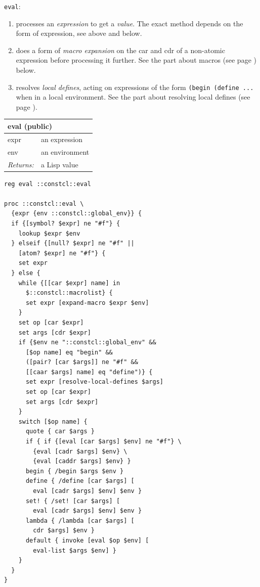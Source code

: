 \documentclass[twoside,9pt]{report}
\begin{document}
\texttt{eval}:

\begin{enumerate}
\item  processes an \emph{expression} to get a \emph{value}. The exact method depends on the form of expression, see above and below.
\item  does a form of \emph{macro expansion} on the car and cdr of a non-atomic expression before processing it further. See the part about macros (see page \pageref{macros}) below.
\item  resolves \emph{local defines}, acting on expressions of the form \texttt{(begin (define ...} when in a local environment. See the part about resolving local defines (see page \pageref{resolving-local-defines}).
\end{enumerate}
\begin{tabular}{ |l l| }
\hline
\multicolumn{2}{|l|}{eval (public)} \\
\hline
expr & an expression \\
env & an environment \\
\textit{Returns:} & a Lisp value \\
\hline
\end{tabular}

\noindent\makebox[\linewidth]{\rule{\linewidth}{0.4pt}}
\begin{lstlisting}
reg eval ::constcl::eval
 
proc ::constcl::eval \
  {expr {env ::constcl::global_env}} {
  if {[symbol? $expr] ne "#f"} {
    lookup $expr $env
  } elseif {[null? $expr] ne "#f" ||
    [atom? $expr] ne "#f"} {
    set expr
  } else {
    while {[[car $expr] name] in
      $::constcl::macrolist} {
      set expr [expand-macro $expr $env]
    }
    set op [car $expr]
    set args [cdr $expr]
    if {$env ne "::constcl::global_env" &&
      [$op name] eq "begin" &&
      ([pair? [car $args]] ne "#f" &&
      [[caar $args] name] eq "define")} {
      set expr [resolve-local-defines $args]
      set op [car $expr]
      set args [cdr $expr]
    }
    switch [$op name] {
      quote { car $args }
      if { if {[eval [car $args] $env] ne "#f"} \
        {eval [cadr $args] $env} \
        {eval [caddr $args] $env} }
      begin { /begin $args $env }
      define { /define [car $args] [
        eval [cadr $args] $env] $env }
      set! { /set! [car $args] [
        eval [cadr $args] $env] $env }
      lambda { /lambda [car $args] [
        cdr $args] $env }
      default { invoke [eval $op $env] [
        eval-list $args $env] }
    }
  }
}
\end{lstlisting}
\noindent\makebox[\linewidth]{\rule{\linewidth}{0.4pt}}
\end{document}
